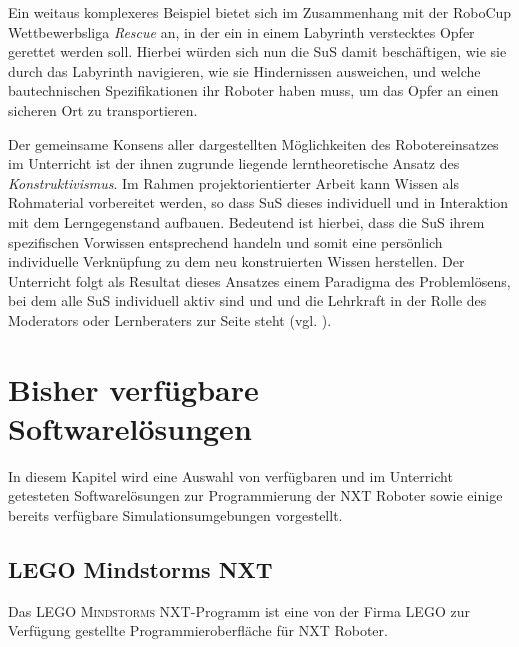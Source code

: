 \documentclass[paper=a4, DIV=calc, BCOR=12mm, twoside=on, onecolumn=on, open = right, titlepage =on, parskip =half-, headsepline = on, footsepline = off, chapterprefix = off, appendixprefix = on, fontsize = 12pt, numbers = noenddot, abstract = on]{scrbook}
\begin{document}
Ein weitaus komplexeres Beispiel bietet sich im Zusammenhang mit der RoboCup Wettbewerbsliga \emph{Rescue} an, in der ein in einem Labyrinth verstecktes Opfer gerettet werden soll. Hierbei würden sich nun die SuS damit beschäftigen, wie sie durch das Labyrinth navigieren, wie sie Hindernissen ausweichen, und welche bautechnischen Spezifikationen ihr Roboter haben muss, um das Opfer an einen sicheren Ort zu transportieren.

Der gemeinsame Konsens aller dargestellten Möglichkeiten des Robotereinsatzes im Unterricht ist der ihnen zugrunde liegende lerntheoretische Ansatz des \emph{Konstruktivismus}. Im Rahmen projektorientierter Arbeit kann Wissen als Rohmaterial vorbereitet werden, so dass SuS dieses individuell und in Interaktion mit dem Lerngegenstand aufbauen. Bedeutend ist hierbei, dass die SuS ihrem spezifischen Vorwissen entsprechend handeln und somit eine persönlich individuelle Verknüpfung zu dem neu konstruierten Wissen herstellen.
Der Unterricht folgt als Resultat dieses Ansatzes einem Paradigma des Problemlösens, bei dem alle SuS individuell aktiv sind und und die Lehrkraft in der Rolle des Moderators oder Lernberaters zur Seite steht (vgl. \cite[S.219f.]{schwarzer:07}).

\chapter{Bisher verfügbare Softwarelösungen}
\label{sec:software bisher}
In diesem Kapitel wird eine Auswahl von verfügbaren und im Unterricht getesteten Softwarelösungen zur Programmierung der NXT Roboter sowie einige bereits verfügbare Simulationsumgebungen vorgestellt. 


\section{LEGO Mindstorms NXT}
\label{sec:LMNXT}

Das \textsc{LEGO Mindstorms} NXT-Programm ist eine von der Firma \textsc{LEGO} zur Verfügung gestellte Programmieroberfläche für NXT Roboter.
\end{document}
